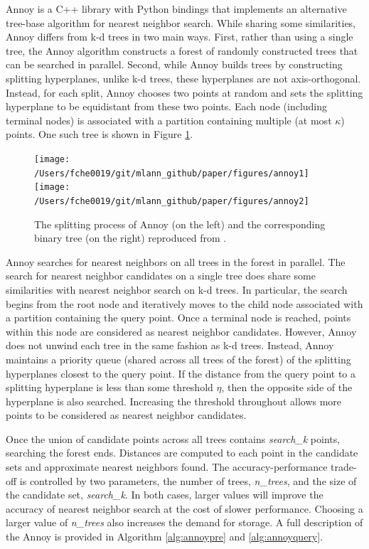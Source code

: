 \documentclass[11pt,a4paper,]{article}
\begin{document}
Annoy \autocite[Approximate Nearest Neighbors Oh Yeah;][]{Bernhardsson2016-tf} is a C++ library with Python bindings that implements an alternative tree-base algorithm for nearest neighbor search. While sharing some similarities, Annoy differs from k-d trees in two main ways. First, rather than using a single tree, the Annoy algorithm constructs a forest of randomly constructed trees that can be searched in parallel. Second, while Annoy builds trees by constructing splitting hyperplanes, unlike k-d trees, these hyperplanes are not axis-orthogonal. Instead, for each split, Annoy chooses two points at random and sets the splitting hyperplane to be equidistant from these two points. Each node (including terminal nodes) is associated with a partition containing multiple (at most \(\kappa\)) points. One such tree is shown in Figure \ref{fig:annoy}.



\begin{figure}

{\centering \texttt{[image: /Users/fche0019/git/mlann\_github/paper/figures/annoy1]} \texttt{[image: /Users/fche0019/git/mlann\_github/paper/figures/annoy2]} 

}

\caption{The splitting process of Annoy (on the left) and the corresponding binary tree (on the right) reproduced from \textcite{Bernhardsson2015-slides}.}\label{fig:annoy}
\end{figure}

Annoy searches for nearest neighbors on all trees in the forest in parallel. The search for nearest neighbor candidates on a single tree does share some similarities with nearest neighbor search on k-d trees. In particular, the search begins from the root node and iteratively moves to the child node associated with a partition containing the query point. Once a terminal node is reached, points within this node are considered as nearest neighbor candidates. However, Annoy does not unwind each tree in the same fashion as k-d trees. Instead, Annoy maintains a priority queue (shared across all trees of the forest) of the splitting hyperplanes closest to the query point. If the distance from the query point to a splitting hyperplane is less than some threshold \(\eta\), then the opposite side of the hyperplane is also searched. Increasing the threshold throughout allows more points to be considered as nearest neighbor candidates.

Once the union of candidate points across all trees contains \textit{search\_k} points, searching the forest ends. Distances are computed to each point in the candidate sets and approximate nearest neighbors found. The accuracy-performance trade-off is controlled by two parameters, the number of trees, \textit{n\_trees}, and the size of the candidate set, \textit{search\_k}. In both cases, larger values will improve the accuracy of nearest neighbor search at the cost of slower performance. Choosing a larger value of \textit{n\_trees} also increases the demand for storage. A full description of the Annoy is provided in Algorithm \ref{alg:annoypre} and \ref{alg:annoyquery}.
\end{document}
